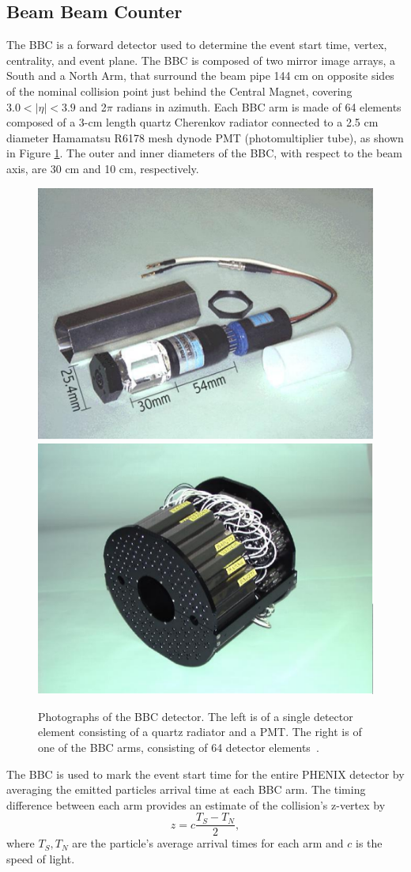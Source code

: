 \subsection{Beam Beam Counter}
\label{sec:bbc_det_sec}
The BBC is a forward detector used to determine the event start time, vertex, centrality, and event plane. The BBC is composed of two mirror image arrays, a South and a North Arm, that surround the beam pipe 144 cm on opposite sides of the nominal collision point just behind the Central Magnet, covering $3.0 < |\eta| < 3.9$ and 2$\pi$ radians in azimuth. Each BBC arm is made of 64 elements composed of a 3-cm length quartz Cherenkov radiator connected to a 2.5 cm diameter Hamamatsu R6178 mesh dynode PMT (photomultiplier tube), as shown in Figure \ref{fig:bbc_dector}. The outer and inner diameters of the BBC, with respect to the beam axis, are 30 cm and 10 cm, respectively.%
\begin{figure}[!ht]
\centering
\includegraphics[width=0.45\linewidth]{figs/bbc_pmt.png}
\includegraphics[width=0.45\linewidth]{figs/bbc_arm.png}
\caption{Photographs of the BBC detector. The left is of a single detector element consisting of a quartz radiator and a PMT. The right is of one of the BBC arms, consisting of 64 detector elements~\cite{Adcox2003469}.}
\label{fig:bbc_dector}
\end{figure}

The BBC is used to mark the event start time for the entire PHENIX detector by averaging the emitted particles arrival time at each BBC arm. The timing difference between each arm provides an estimate of the collision's z-vertex by
\begin{equation}
z = c \frac{T_S - T_N}{2},
\end{equation}
where $T_S, T_N$ are the particle's average arrival times for each arm and $c$ is the speed of light.%

